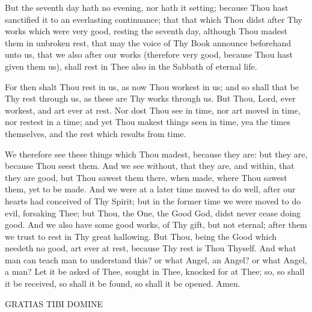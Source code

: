 \documentclass[b5paper,openright,12pt,twoside]{book}
\begin{document}
But the seventh day hath no evening, nor hath it setting; because Thou
hast sanctified it to an everlasting continuance; that that which Thou
didst after Thy works which were very good, resting the seventh day,
although Thou madest them in unbroken rest, that may the voice of
Thy Book announce beforehand unto us, that we also after our works
(therefore very good, because Thou hast given them us), shall rest in
Thee also in the Sabbath of eternal life.

For then shalt Thou rest in us, as now Thou workest in us; and so shall
that be Thy rest through us, as these are Thy works through us. But
Thou, Lord, ever workest, and art ever at rest. Nor dost Thou see in
time, nor art moved in time, nor restest in a time; and yet Thou makest
things seen in time, yea the times themselves, and the rest which
results from time.

We therefore see these things which Thou madest, because they are: but
they are, because Thou seest them. And we see without, that they are,
and within, that they are good, but Thou sawest them there, when made,
where Thou sawest them, yet to be made. And we were at a later time
moved to do well, after our hearts had conceived of Thy Spirit; but in
the former time we were moved to do evil, forsaking Thee; but Thou, the
One, the Good God, didst never cease doing good. And we also have some
good works, of Thy gift, but not eternal; after them we trust to rest in
Thy great hallowing. But Thou, being the Good which needeth no good, art
ever at rest, because Thy rest is Thou Thyself. And what man can teach
man to understand this? or what Angel, an Angel? or what Angel, a man?
Let it be asked of Thee, sought in Thee, knocked for at Thee; so, so
shall it be received, so shall it be found, so shall it be opened. Amen.

                         GRATIAS TIBI DOMINE
\end{document}

